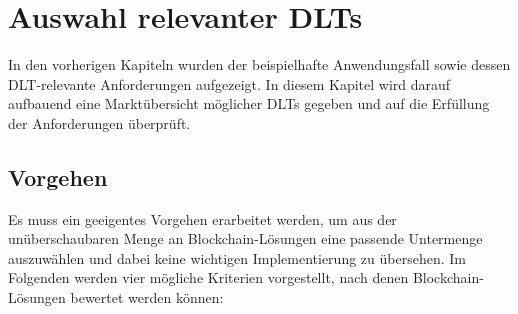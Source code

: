 \chapter{Auswahl relevanter DLTs}
\label{ch:dlt_selection}
In den vorherigen Kapiteln wurden der beispielhafte Anwendungsfall sowie dessen \ac{DLT}-relevante Anforderungen aufgezeigt. In diesem Kapitel wird darauf aufbauend eine Marktübersicht möglicher \acp{DLT} gegeben und auf die Erfüllung der Anforderungen überprüft.

%
%
\section{Vorgehen}
\label{sec:dlt_selection:approach}
Es muss ein geeigentes Vorgehen erarbeitet werden, um aus der unüberschaubaren Menge an Blockchain-Lösungen eine passende Untermenge auszuwählen und dabei keine wichtigen Implementierung zu übersehen. Im Folgenden werden vier mögliche Kriterien vorgestellt, nach denen Blockchain-Lösungen bewertet werden können:
